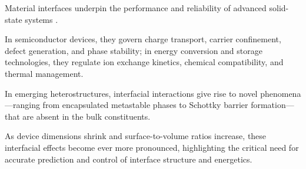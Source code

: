 \label{chapter:introduction}

\label{para:interface_importance}
Material interfaces underpin the performance and reliability of advanced solid-state systems \cite{Leung2020-tv,Di_Liberto2022-gz,Leitherer2023-ew}.

In semiconductor devices, they govern charge transport, carrier confinement, defect generation, and phase stability; in energy conversion and storage technologies, they regulate ion exchange kinetics, chemical compatibility, and thermal management.

In emerging heterostructures, interfacial interactions give rise to novel phenomena—ranging from encapsulated metastable phases to Schottky barrier formation—that are absent in the bulk constituents.

As device dimensions shrink and surface-to-volume ratios increase, these interfacial effects become ever more pronounced, highlighting the critical need for accurate prediction and control of interface structure and energetics.


\label{section:material_interfaces}
\label{para:interface_foundation}
\label{para:material_interface_definition}
\label{para:interface_classification}
\label{para:interface_coherence}
\label{para:chemical_contrast_hetero_homo}
\label{para:interface_classifications_continued}
\label{para:interface_effects_2D_oxides}
\label{para:band_alignment_interfaces}
\label{para:interface_states}
\label{para:dielectric_interface_permittivity}
\label{para:thermal_transport_interfaces}
\label{para:interface_mechanical_properties}
\label{para:interface_optical_effects}
\label{para:interface_summary}

\label{para:interface_stability_challenge}
\label{para:dft_scalability_bottleneck}
\label{para:mlp_screening}
\label{para:hierarchical_modelling_workflow}
\label{para:report_structure}
\label{para:framework_objective}

\label{section:motivation}
\label{para:nonideal_interface_formation}
\label{para:dft_scaling_limitations}
\label{para:mlp_overview}
\label{para:motivation_mlp_dft}
\label{para:feature_based_interface_prediction}
\label{para:project_motivation}

\label{section:research_objectives}
\label{para:mlp_interface_aims}
\label{para:interface_config_space}
\label{para:mlp_pipeline_integration}
\label{para:core_objectives}
\label{para:scalable_screening_implications}

\label{section:scientific_and_practical_significance}
\label{para:interfaces_nanoscale_behaviour}
\label{para:interfacial_electronic_shifts}
\label{para:dft_scaling_cost}
\label{para:mlp_workflow_integration}
\label{para:ml_interface_dynamics}
\label{para:project_contributions}
\label{para:advancing_interface_discovery}

